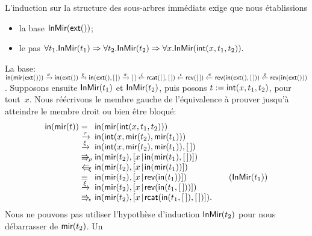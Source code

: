 L'induction sur la structure des sous-arbres immédiats exige que nous
établissions
\begin{itemize}

  \item la base
  \(\textsf{InMir}({\textsf{ext}()})\);

  \item le pas \(\forall t_1.\textsf{InMir}({t_1}) \Rightarrow
  \forall t_2.\textsf{InMir}({t_2}) \Rightarrow \forall
  x.\textsf{InMir}({\textsf{int}(x,t_1,t_2)}).\)

\end{itemize}
La base: \(\textsf{in}(\textsf{mir}(\textsf{ext}()))
\xrightarrow{\smash{\sigma}} \textsf{in}(\textsf{ext}())
\xrightarrow{\smash{\xi}} \textsf{in}(\textsf{ext}(),[\,])
\xrightarrow{\smash{\pi}} [\,] \xleftarrow{\smash{\zeta}}
\textsf{rcat}([\,],[\,]) \xleftarrow{\smash{\epsilon}} \textsf{rev}([\,])
\xleftarrow{\smash{\pi}} \textsf{rev}(\textsf{in}(\textsf{ext}(),[\,]))
\xleftarrow{\smash{\xi}}
\textsf{rev}(\textsf{in}(\textsf{ext}()))\).
Supposons ensuite \(\textsf{InMir}({t_1})\) et \(\textsf{InMir}({t_2})\), puis
posons \(t := \textsf{int}(x,t_1,t_2)\), pour tout~\(x\). Nous réécrivons
le membre gauche de l'équivalence à prouver jusqu'à atteindre le
membre droit ou bien être bloqué:
\begin{equation*}
\begin{array}{@{}r@{\;}l@{\;}l@{\qquad}r@{}}
\fun{in}(\fun{mir}(t)) & = &
\fun{in}(\fun{mir}(\fun{int}(x,t_1,t_2)))\\
& \xrightarrow{\smash{\tau}}
& \fun{in}(\fun{int}(x,\fun{mir}(t_2),\fun{mir}(t_1)))\\
& \xrightarrow{\smash{\xi}}
& \fun{in}(\fun{int}(x,\fun{mir}(t_2),\fun{mir}(t_1)),\el)\\
& \Rra{\rho}
& \fun{in}(\fun{mir}(t_2),\cons{x}{\fun{in}(\fun{mir}(t_1),\el)})\\
& \Lla{\xi}
& \fun{in}(\fun{mir}(t_2),\cons{x}{\fun{in}(\fun{mir}(t_1))})\\
& \equiv
& \fun{in}(\fun{mir}(t_2),\cons{x}{\fun{rev}(\fun{in}(t_1))})
& (\pred{InMir}{t_1})\\
& \xrightarrow{\smash{\xi}}
& \fun{in}(\fun{mir}(t_2),\cons{x}{\fun{rev}(\fun{in}(t_1,\el))})\\
& \Rra{\epsilon}
& \fun{in}(\fun{mir}(t_2),\cons{x}{\fun{rcat}(\fun{in}(t_1,\el),\el)}).
\end{array}
\end{equation*}
Nous ne pouvons pas utiliser l'hypothèse d'induction
\(\textsf{InMir}({t_2})\) pour nous débarrasser de \(\textsf{mir}(t_2)\). Un

